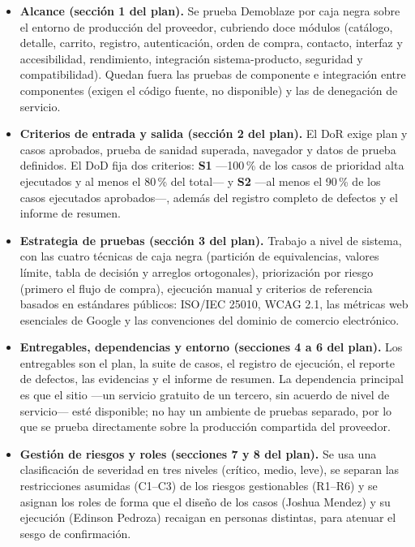 \documentclass[11pt,a4paper]{article}
\begin{document}
\begin{itemize}
  \item \textbf{Alcance (sección 1 del plan).} Se prueba Demoblaze por caja negra sobre
        el entorno de producción del proveedor, cubriendo doce módulos (catálogo, detalle,
        carrito, registro, autenticación, orden de compra, contacto, interfaz y
        accesibilidad, rendimiento, integración sistema-producto, seguridad y
        compatibilidad). Quedan fuera las pruebas de componente e integración entre
        componentes (exigen el código fuente, no disponible) y las de denegación de
        servicio.
  \item \textbf{Criterios de entrada y salida (sección 2 del plan).} El DoR exige plan y
        casos aprobados, prueba de sanidad superada, navegador y datos de prueba
        definidos. El DoD fija dos criterios: \textbf{S1} —100\,\% de los casos de
        prioridad alta ejecutados y al menos el 80\,\% del total— y \textbf{S2} —al menos
        el 90\,\% de los casos ejecutados aprobados—, además del registro completo de
        defectos y el informe de resumen.
  \item \textbf{Estrategia de pruebas (sección 3 del plan).} Trabajo a nivel de sistema,
        con las cuatro técnicas de caja negra (partición de equivalencias, valores límite,
        tabla de decisión y arreglos ortogonales), priorización por riesgo (primero el
        flujo de compra), ejecución manual y criterios de referencia basados en estándares
        públicos: ISO/IEC 25010, WCAG 2.1, las métricas web esenciales de Google y las
        convenciones del dominio de comercio electrónico.
  \item \textbf{Entregables, dependencias y entorno (secciones 4 a 6 del plan).} Los
        entregables son el plan, la suite de casos, el registro de ejecución, el reporte
        de defectos, las evidencias y el informe de resumen. La dependencia principal es
        que el sitio —un servicio gratuito de un tercero, sin acuerdo de nivel de
        servicio— esté disponible; no hay un ambiente de pruebas separado, por lo que se
        prueba directamente sobre la producción compartida del proveedor.
  \item \textbf{Gestión de riesgos y roles (secciones 7 y 8 del plan).} Se usa una
        clasificación de severidad en tres niveles (crítico, medio, leve), se separan las
        restricciones asumidas (C1--C3) de los riesgos gestionables (R1--R6) y se asignan
        los roles de forma que el diseño de los casos (Joshua Mendez) y su ejecución
        (Edinson Pedroza) recaigan en personas distintas, para atenuar el sesgo de
        confirmación.
\end{itemize}
\end{document}

